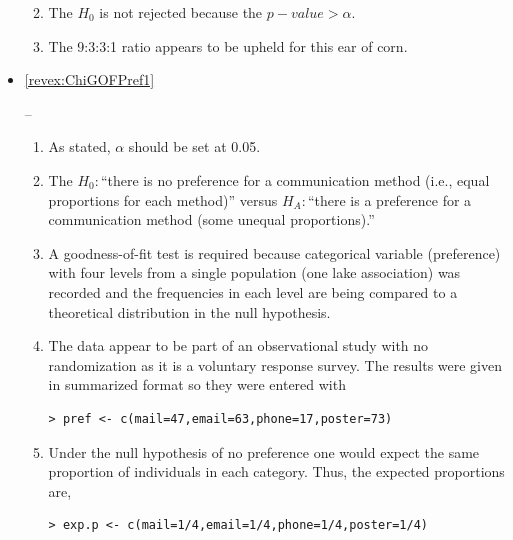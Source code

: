 \documentclass[10pt,openany]{book}\usepackage[]{graphicx}\usepackage[]{color}
\makeatletter
\newenvironment{kframe}{%
 \def\at@end@of@kframe{}%
 \ifinner\ifhmode%
  \def\at@end@of@kframe{\end{minipage}}%
  \begin{minipage}{\columnwidth}%
 \fi\fi%
 \def\FrameCommand##1{\hskip\@totalleftmargin \hskip-\fboxsep
 \colorbox{shadecolor}{##1}\hskip-\fboxsep
     \hskip-\linewidth \hskip-\@totalleftmargin \hskip\columnwidth}%
 \MakeFramed {\advance\hsize-\width
   \@totalleftmargin\z@ \linewidth\hsize
   \@setminipage}}%
 {\par\unskip\endMakeFramed%
 \at@end@of@kframe}
\newenvironment{knitrout}{}{} %
\makeatother
\begin{document}
\begin{itemize}
\begin{enumerate}
\begin{knitrout}
{}



\end{knitrout}
      \item The $H_{0}$ is not rejected because the $p-value>\alpha$.
      \item The 9:3:3:1 ratio appears to be upheld for this ear of corn.
    \end{enumerate}

  \item \hypertarget{ans:ChiGOFPref1}{\ref{revex:ChiGOFPref1}} --
    \begin{enumerate}
      \item As stated, $\alpha$ should be set at 0.05.
      \item The $H_{0}:$``there is no preference for a communication method (i.e., equal proportions for each method)'' versus $H_{A}:$``there is a preference for a communication method (some unequal proportions).''
      \item A goodness-of-fit test is required because categorical variable (preference) with four levels from a single population (one lake association) was recorded and the frequencies in each level are being compared to a theoretical distribution in the null hypothesis.
      \item The data appear to be part of an observational study with no randomization as it is a voluntary response survey.  The results were given in summarized format so they were entered with
\begin{knitrout}
\color{fgcolor}\begin{kframe}
\begin{verbatim}
> pref <- c(mail=47,email=63,phone=17,poster=73)
\end{verbatim}
\end{kframe}
\end{knitrout}
      \item Under the null hypothesis of no preference one would expect the same proportion of individuals in each category.  Thus, the expected proportions are,
\begin{knitrout}
\color{fgcolor}\begin{kframe}
\begin{verbatim}
> exp.p <- c(mail=1/4,email=1/4,phone=1/4,poster=1/4)
\end{verbatim}
\end{kframe}
\end{knitrout}

\end{enumerate}
\end{itemize}
\end{document}
